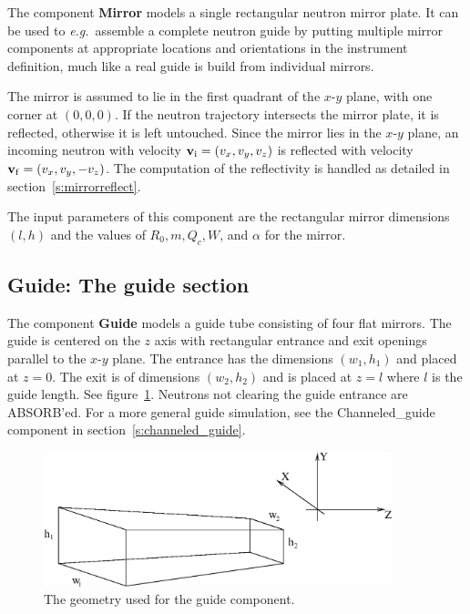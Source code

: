 The component {\bf Mirror} 
models a single rectangular neutron mirror plate. It can
be used to \textit{e.g.}~assemble a complete neutron guide by putting multiple
mirror components at appropriate locations and orientations in the
instrument definition, much like a real guide is build from individual
mirrors.

The mirror is assumed to lie in the first quadrant of the
$x$-$y$ plane, with one corner at $(0,0,0)$. 
If the neutron trajectory intersects the mirror plate, it is
reflected, otherwise it is left untouched. Since the mirror lies in the
$x$-$y$ plane, an incoming neutron with velocity 
${\bf v}_{\rm i} = (v_x,v_y,v_z)$
is reflected with velocity ${\bf v}_{\rm f} = (v_x,v_y,-v_z)$. 
The computation of the reflectivity is handled as detailed in
section~\ref{s:mirrorreflect}.

The input parameters of this component are
the rectangular mirror dimensions $(l, h)$
and the values of $R_0, m, Q_c, W$, and $\alpha$ for the mirror.


\subsection{Guide: The guide section}

The component {\bf Guide} 
models a guide tube consisting of four flat mirrors. The
guide is centered on the $z$ axis with rectangular entrance and exit
openings parallel to the $x$-$y$ plane. The entrance has the dimensions
$(w_1,h_1)$ and placed at $z=0$. The exit is of dimensions $(w_2,h_2)$
and is placed at $z=l$ where $l$ is the guide length. See
figure~\ref{f:guide}. Neutrons not clearing the guide entrance are
ABSORB'ed. For a more general guide simulation, see the Channeled\_guide
component in section~\ref{s:channeled_guide}.

\begin{figure}
  \begin{center}
    \includegraphics[width=0.9\textwidth]{figures/guide1.eps}
  \end{center}
\caption{The geometry used for the guide component.}
\label{f:guide}
\end{figure}

